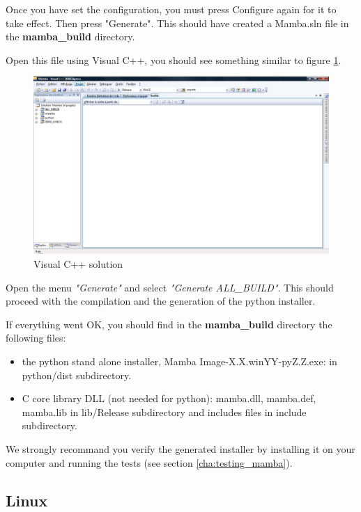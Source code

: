 \documentclass[a4paper,10pt,oneside]{article}
\begin{document}
Once you have set the configuration, you must press Configure again for it to
take effect. Then press "Generate". This should have created a Mamba.sln file
in the \textbf{mamba\_build} directory.

Open this file using Visual C++, you should see something similar to figure
\ref{fig:visualcpp}.

\begin{figure}
\centering
\includegraphics[scale=0.3]{images/visualcpp.png}
\caption{Visual C++ solution}
\label{fig:visualcpp}
\end{figure}

Open the menu \textit{"Generate"} and select \textit{"Generate ALL\_BUILD"}.
This should proceed with the compilation and the generation of the python installer.

If everything went OK, you should find in the \textbf{mamba\_build} directory
the following files:
\begin{itemize}
\item the python stand alone installer, Mamba Image-X.X.winYY-pyZ.Z.exe: in python/dist subdirectory.
\item C core library DLL (not needed for python): mamba.dll, mamba.def, mamba.lib in lib/Release subdirectory and includes files in include subdirectory.
\end{itemize}

We strongly recommand you verify the generated installer by installing it on
your computer and running the tests (see section \ref{cha:testing_mamba}).

\subsection{Linux}
\end{document}
